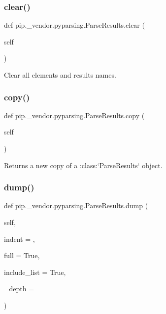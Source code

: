 \subsubsection{\texorpdfstring{clear()}{clear()}}
{\footnotesize\ttfamily def pip.\+\_\+vendor.\+pyparsing.\+Parse\+Results.\+clear (\begin{DoxyParamCaption}\item[{}]{self }\end{DoxyParamCaption})}

\begin{DoxyVerb}Clear all elements and results names.
\end{DoxyVerb}
 \mbox{\label{classpip_1_1__vendor_1_1pyparsing_1_1ParseResults_ad78b103022f20dd4457aea6f28db7cf3}} 
\subsubsection{\texorpdfstring{copy()}{copy()}}
{\footnotesize\ttfamily def pip.\+\_\+vendor.\+pyparsing.\+Parse\+Results.\+copy (\begin{DoxyParamCaption}\item[{}]{self }\end{DoxyParamCaption})}

\begin{DoxyVerb}Returns a new copy of a :class:`ParseResults` object.
\end{DoxyVerb}
 \mbox{\label{classpip_1_1__vendor_1_1pyparsing_1_1ParseResults_a72363ec5208e922eae5732bf122c0480}} 
\subsubsection{\texorpdfstring{dump()}{dump()}}
{\footnotesize\ttfamily def pip.\+\_\+vendor.\+pyparsing.\+Parse\+Results.\+dump (\begin{DoxyParamCaption}\item[{}]{self,  }\item[{}]{indent = {\ttfamily \textquotesingle{}\textquotesingle{}},  }\item[{}]{full = {\ttfamily True},  }\item[{}]{include\+\_\+list = {\ttfamily True},  }\item[{}]{\+\_\+depth = {} }\end{DoxyParamCaption})}

